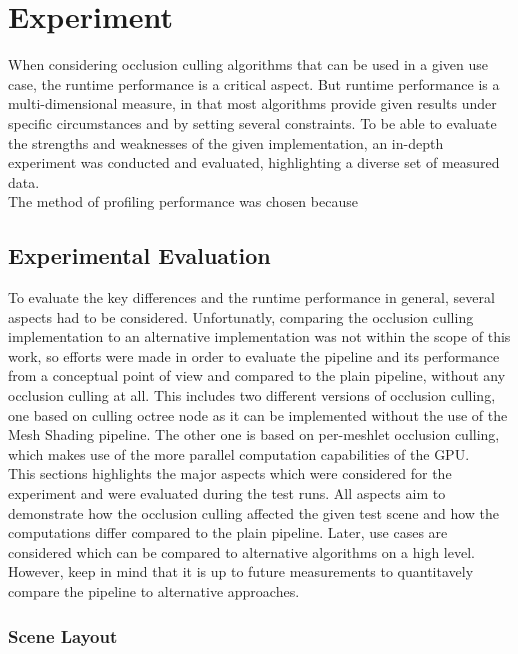 \chapter{Experiment} \label{cpt-experiment}

When considering occlusion culling algorithms that can be used in a given use case, the runtime 
performance is a critical aspect. But runtime performance is a multi-dimensional measure, in that 
most algorithms provide given results under specific circumstances and by setting several constraints.
To be able to evaluate the strengths and weaknesses of the given implementation, an in-depth  
experiment was conducted and evaluated, highlighting a diverse set of measured data. \\ 

\noindent
The method of profiling performance was chosen because 

\section{Experimental Evaluation} \label{sec-experimental-evaluation}

To evaluate the key differences and the runtime performance in general, several aspects had to be considered.
Unfortunatly, comparing the occlusion culling implementation to an alternative implementation was not within the 
scope of this work, so efforts were made in order to evaluate the pipeline and its performance from a conceptual 
point of view and compared to the plain pipeline, without any occlusion culling at all. This includes two different 
versions of occlusion culling, one based on culling octree node as it can be implemented without the use of the 
Mesh Shading pipeline. The other one is based on per-meshlet occlusion culling, which makes use of the more parallel 
computation capabilities of the \ac{GPU}. \\

\noindent
This sections highlights the major aspects which were considered for the experiment and were evaluated during the 
test runs. All aspects aim to demonstrate how the occlusion culling affected the given test scene and how the 
computations differ compared to the plain pipeline. Later, use cases are considered which can be compared to 
alternative algorithms on a high level. However, keep in mind that it is up to future measurements to quantitavely 
compare the pipeline to alternative approaches. 


\subsection*{Scene Layout}

